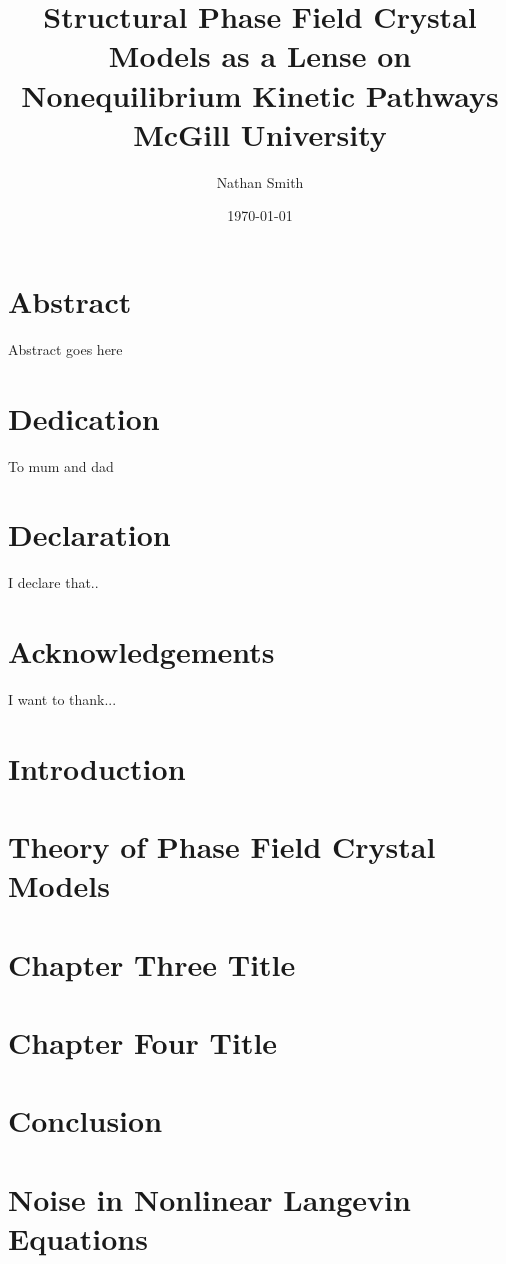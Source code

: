 \documentclass[12pt, twoside]{report}
\title{
	{Structural Phase Field Crystal Models as a Lense on Nonequilibrium Kinetic Pathways}\\
	{\large McGill University}\\
}
\author{Nathan Smith}
\date{\today}
\begin{document}
\maketitle
\tableofcontents

\chapter*{Abstract}
Abstract goes here

\chapter*{Dedication}
To mum and dad

\chapter*{Declaration}
I declare that..

\chapter*{Acknowledgements}
I want to thank...

\tableofcontents

\chapter{Introduction}

\chapter{Theory of Phase Field Crystal Models}


\chapter{Chapter Three Title}

\chapter{Chapter Four Title}

\chapter{Conclusion}

\appendix
\chapter{Noise in Nonlinear Langevin Equations}


\end{document}
